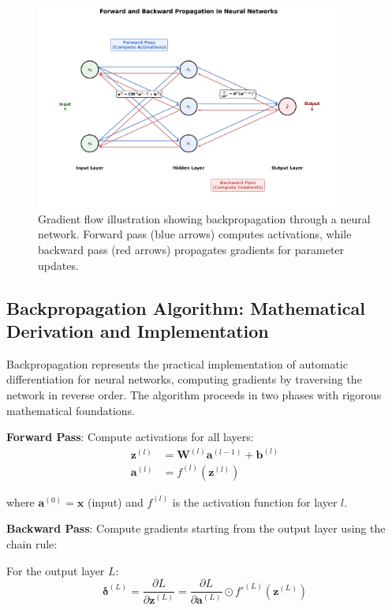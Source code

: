 \documentclass[11pt,a4paper]{report}
\begin{document}
\begin{figure}[H]
\centering
\includegraphics[width=0.9\textwidth]{gradient_flow_diagram.png}
\caption{Gradient flow illustration showing backpropagation through a neural network. Forward pass (blue arrows) computes activations, while backward pass (red arrows) propagates gradients for parameter updates.}
\label{fig:gradient_flow}
\end{figure}

\subsection{Backpropagation Algorithm: Mathematical Derivation and Implementation}

Backpropagation represents the practical implementation of automatic differentiation for neural networks, computing gradients by traversing the network in reverse order. The algorithm proceeds in two phases with rigorous mathematical foundations.

\textbf{Forward Pass}: Compute activations for all layers:
\begin{align}
\mathbf{z}^{(l)} &= \mathbf{W}^{(l)} \mathbf{a}^{(l-1)} + \mathbf{b}^{(l)} \\
\mathbf{a}^{(l)} &= f^{(l)}(\mathbf{z}^{(l)})
\end{align}

where $\mathbf{a}^{(0)} = \mathbf{x}$ (input) and $f^{(l)}$ is the activation function for layer $l$.

\textbf{Backward Pass}: Compute gradients starting from the output layer using the chain rule:

For the output layer $L$:
\begin{equation}
\boldsymbol{\delta}^{(L)} = \frac{\partial L}{\partial \mathbf{z}^{(L)}} = \frac{\partial L}{\partial \mathbf{a}^{(L)}} \odot f'^{(L)}(\mathbf{z}^{(L)})
\end{equation}
\end{document}
